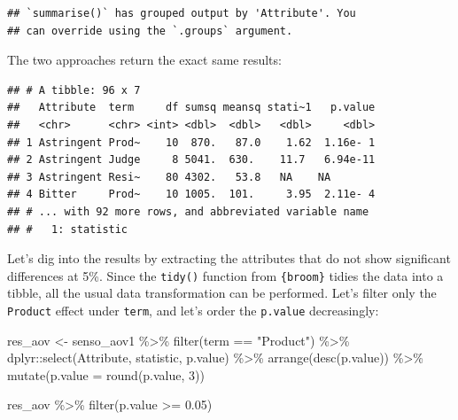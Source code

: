 \documentclass[
]{krantz}
\makeatletter
\newenvironment{Shaded}{\begin{snugshade}}{\end{snugshade}}
\newcommand{\AttributeTok}[1]{\textcolor[rgb]{0.61,0.61,0.61}{#1}}
\newcommand{\DecValTok}[1]{\textcolor[rgb]{0.06,0.06,0.06}{#1}}
\newcommand{\FloatTok}[1]{\textcolor[rgb]{0.06,0.06,0.06}{#1}}
\newcommand{\FunctionTok}[1]{\textcolor[rgb]{0,0,0}{#1}}
\newcommand{\NormalTok}[1]{#1}
\newcommand{\OtherTok}[1]{\textcolor[rgb]{0.37,0.37,0.37}{#1}}
\newcommand{\SpecialCharTok}[1]{\textcolor[rgb]{0,0,0}{#1}}
\newcommand{\StringTok}[1]{\textcolor[rgb]{0.5,0.5,0.5}{#1}}
\newenvironment{kframe}{%
\medskip{}
\setlength{\fboxsep}{.8em}
 \def\at@end@of@kframe{}%
 \ifinner\ifhmode%
  \def\at@end@of@kframe{\end{minipage}}%
  \begin{minipage}{\columnwidth}%
 \fi\fi%
 \def\FrameCommand##1{\hskip\@totalleftmargin \hskip-\fboxsep
 \colorbox{shadecolor}{##1}\hskip-\fboxsep
     \hskip-\linewidth \hskip-\@totalleftmargin \hskip\columnwidth}%
 \MakeFramed {\advance\hsize-\width
   \@totalleftmargin\z@ \linewidth\hsize
   \@setminipage}}%
 {\par\unskip\endMakeFramed%
 \at@end@of@kframe}
\renewenvironment{Shaded}{\begin{kframe}}{\end{kframe}}
\makeatother
\begin{document}
\begin{verbatim}
## `summarise()` has grouped output by 'Attribute'. You
## can override using the `.groups` argument.
\end{verbatim}

The two approaches return the exact same results:

\begin{verbatim}
## # A tibble: 96 x 7
##   Attribute  term     df sumsq meansq stati~1   p.value
##   <chr>      <chr> <int> <dbl>  <dbl>   <dbl>     <dbl>
## 1 Astringent Prod~    10  870.   87.0    1.62  1.16e- 1
## 2 Astringent Judge     8 5041.  630.    11.7   6.94e-11
## 3 Astringent Resi~    80 4302.   53.8   NA    NA       
## 4 Bitter     Prod~    10 1005.  101.     3.95  2.11e- 4
## # ... with 92 more rows, and abbreviated variable name
## #   1: statistic
\end{verbatim}

Let's dig into the results by extracting the attributes that do not show significant differences at 5\%. Since the \texttt{tidy()} function from \texttt{\{broom\}} tidies the data into a tibble, all the usual data transformation can be performed. Let's filter only the \texttt{Product} effect under \texttt{term}, and let's order the \texttt{p.value} decreasingly:

\begin{Shaded}
\begin{Highlighting}[]
\NormalTok{res\_aov }\OtherTok{\textless{}{-}}\NormalTok{ senso\_aov1 }\SpecialCharTok{\%\textgreater{}\%}
  \FunctionTok{filter}\NormalTok{(term }\SpecialCharTok{==} \StringTok{"Product"}\NormalTok{) }\SpecialCharTok{\%\textgreater{}\%}
\NormalTok{  dplyr}\SpecialCharTok{::}\FunctionTok{select}\NormalTok{(Attribute, statistic, p.value) }\SpecialCharTok{\%\textgreater{}\%}
  \FunctionTok{arrange}\NormalTok{(}\FunctionTok{desc}\NormalTok{(p.value)) }\SpecialCharTok{\%\textgreater{}\%}
  \FunctionTok{mutate}\NormalTok{(}\AttributeTok{p.value =} \FunctionTok{round}\NormalTok{(p.value, }\DecValTok{3}\NormalTok{))}
\end{Highlighting}
\end{Shaded}

\begin{Shaded}
\begin{Highlighting}[]
\NormalTok{res\_aov }\SpecialCharTok{\%\textgreater{}\%}
  \FunctionTok{filter}\NormalTok{(p.value }\SpecialCharTok{\textgreater{}=} \FloatTok{0.05}\NormalTok{)}
\end{Highlighting}
\end{Shaded}
\end{document}
